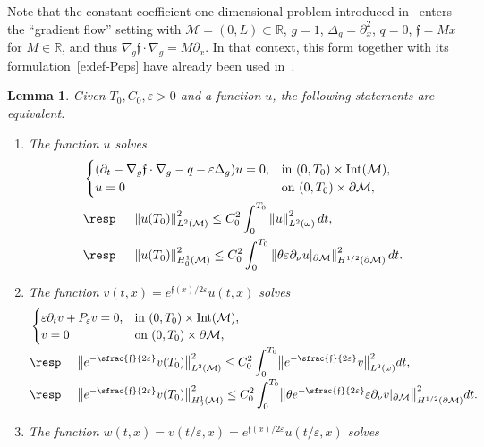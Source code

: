 \documentclass[JEP,XML,SOM,Unicode]{cedram}
\newtheorem{lemma}{Lemma}[section]
\theoremstyle{definition}
\newcommand{\M}{\ensuremath{\mathcal M}}
\newcommand{\mb}[1]{\ensuremath{\mathbb{#1}}}
\newcommand{\R}{{\mb{R}}}
\newcommand{\f}{\ensuremath{\mathfrak{f}}}
\DeclareMathOperator{\Int}{Int}
\newcommand\Lap{\Delta_{g}}
\newcommand\nablag{\nabla_{g}}
\newcommand\nor[2]{\left\|#1\right\|_{#2}}
\newcommand\bnor[2]{\bigl\|#1\bigr\|_{#2}}
\let\d\partial
\let\eps\varepsilon
\let\q q
\begin{document}
Note that the constant coefficient one-dimensional problem introduced in~\cite{CG:05} enters the ``gradient flow'' setting with $\M =(0,L)\subset \R$, $g=1$, $\Lap=\d_x^2$, $\q=0$, $\f = M x$ for $M\in \R$, and thus $\nablag \f \cdot \nablag = M \d_x$. In that context, this form together with its formulation~\eqref{e:def-Peps} have already been used in~\cite{CG:05,Gla:10,Lissy:14,Lissy:15}.
\begin{lemma}
\label{lemequiveunif}
Given $T_0, C_0, \eps >0$ and a function $u$, the following statements are equivalent.
\begin{enumerate}
\item The function $u$ solves
\begin{align}
\label{e:heat-transp-eps}
&\begin{cases}
(\d_t - \nablag \f\cdot \nablag -\q - \eps \Delta_g ) u = 0, & \text{in } (0,T_0)\times\Int(\M), \\
u = 0 & \text{on } (0,T_0)\times \d\M,
\end{cases}
\\
\label{e:obs-heat-transp-eps}
&\text{\resp }\quad \nor{u(T_0)}{L^2(\M)}^2 \leq C_0^2\int_0^{T_0}\nor{u}{L^2(\omega)}^2 dt, \\
\label{e:obs-heat-transp-epsboundary}
&\text{\resp }\quad \nor{u(T_0)}{H^1_0(\M)}^2 \leq C_0^2\int_0^{T_0}\nor{\theta \eps \partial_{\nu}u|_{\d\M}}{H^{1/2}(\d\M)}^2 dt.
\end{align}
\item The function $v(t,x)= e^{\f(x)/2\eps}u(t,x)$ solves
\begin{align}
\label{e:heat-transp-eps-Witt}
&\begin{cases}
\eps \partial_t v + P_\eps v =0, & \text{in } (0,T_0)\times\Int(\M), \\
v = 0 & \text{on } (0,T_0)\times \d\M,
\end{cases}
\\[-2pt]
\label{e:obs-heat-transp-eps-Witt}
&\text{\resp }\quad \bnor{e^{-\sfrac{\f}{2\eps}}v(T_0)}{L^2(\M)}^2 \leq C_0^2\int_0^{T_0}\bnor{e^{-\sfrac{\f}{2\eps}}v }{L^2(\omega)}^2 dt, \\[-2pt]
\label{e:obs-heat-transp-eps-Wittboundary}
&\text{\resp }\quad \bnor{e^{-\sfrac{\f}{2\eps}}v(T_0)}{H^1_0(\M)}^2 \leq C_0^2\int_0^{T_0}\bnor{\theta e^{-\sfrac{\f}{2\eps}} \eps \partial_{\nu}v|_{\d\M} }{H^{1/2}(\d\M)}^2 dt.
\end{align}
\item The function $w(t,x) = v(t/\eps, x)= e^{\f(x)/2\eps}u(t/\eps,x)$ solves
\begin{align}

\end{align}
\end{enumerate}
\end{lemma}
\end{document}
